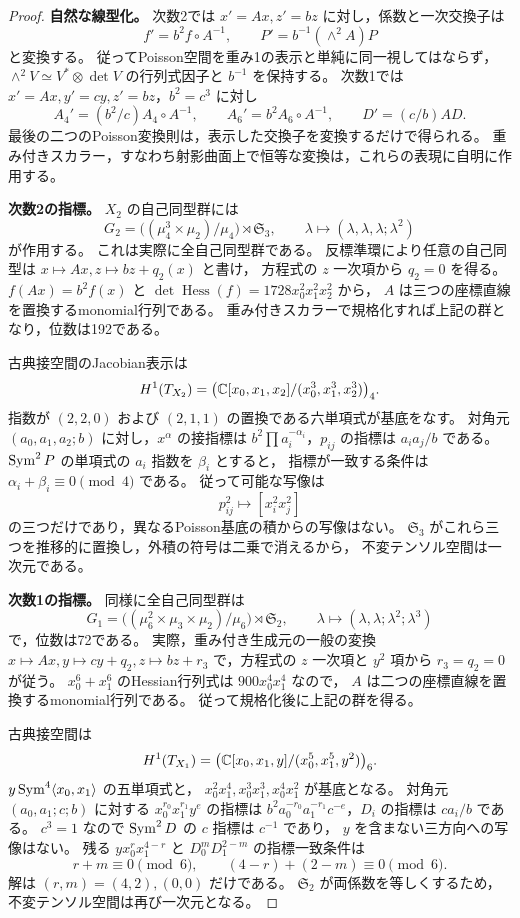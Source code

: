 \begin{proof}
\textbf{自然な線型化。}
次数2では $x'=Ax,z'=bz$ に対し，係数と一次交換子は
\[
 f'=b^2f\circ A^{-1},\qquad
 P'=b^{-1}(\wedge^2A)P
\]
と変換する。
従ってPoisson空間を重み1の表示と単純に同一視してはならず，
$\wedge^2V\simeq V^*\otimes\det V$ の行列式因子と $b^{-1}$ を保持する。
次数1では $x'=Ax,y'=cy,z'=bz$，$b^2=c^3$ に対し
\[
 A_4'=(b^2/c)A_4\circ A^{-1},\qquad
 A_6'=b^2A_6\circ A^{-1},\qquad
 D'=(c/b)AD.
\]
最後の二つのPoisson変換則は，表示した交換子を変換するだけで得られる。
重み付きスカラー，すなわち射影曲面上で恒等な変換は，これらの表現に自明に作用する。

\textbf{次数2の指標。}
$X_2$ の自己同型群には
\[
 G_2=\bigl((\mu_4^3\times\mu_2)/\mu_4\bigr)\rtimes\mathfrak S_3,
 \qquad
 \lambda\longmapsto(\lambda,\lambda,\lambda;\lambda^2)
\]
が作用する。
これは実際に全自己同型群である。
反標準環により任意の自己同型は $x\mapsto Ax,z\mapsto bz+q_2(x)$ と書け，
方程式の $z$ 一次項から $q_2=0$ を得る。
$f(Ax)=b^2f(x)$ と
$\det\operatorname{Hess}(f)=1728x_0^2x_1^2x_2^2$ から，
$A$ は三つの座標直線を置換するmonomial行列である。
重み付きスカラーで規格化すれば上記の群となり，位数は192である。

古典接空間のJacobian表示は
\[
 H^1(T_{X_2})=
 \bigl(\mathbb C[x_0,x_1,x_2]/(x_0^3,x_1^3,x_2^3)\bigr)_4.
\]
指数が $(2,2,0)$ および $(2,1,1)$ の置換である六単項式が基底をなす。
対角元 $(a_0,a_1,a_2;b)$ に対し，$x^\alpha$ の接指標は
$b^2\prod a_i^{-\alpha_i}$，$p_{ij}$ の指標は $a_ia_j/b$ である。
$\operatorname{Sym}^2P$ の単項式の $a_i$ 指数を $\beta_i$ とすると，
指標が一致する条件は $\alpha_i+\beta_i\equiv0\pmod4$ である。
従って可能な写像は
\[
 p_{ij}^2\longmapsto[x_i^2x_j^2]
\]
の三つだけであり，異なるPoisson基底の積からの写像はない。
$\mathfrak S_3$ がこれら三つを推移的に置換し，外積の符号は二乗で消えるから，
不変テンソル空間は一次元である。

\textbf{次数1の指標。}
同様に全自己同型群は
\[
 G_1=\bigl((\mu_6^2\times\mu_3\times\mu_2)/\mu_6\bigr)
       \rtimes\mathfrak S_2,
 \qquad
 \lambda\longmapsto(\lambda,\lambda;\lambda^2;\lambda^3)
\]
で，位数は72である。
実際，重み付き生成元の一般の変換
$x\mapsto Ax,y\mapsto cy+q_2,z\mapsto bz+r_3$
で，方程式の $z$ 一次項と $y^2$ 項から $r_3=q_2=0$ が従う。
$x_0^6+x_1^6$ のHessian行列式は $900x_0^4x_1^4$ なので，
$A$ は二つの座標直線を置換するmonomial行列である。
従って規格化後に上記の群を得る。

古典接空間は
\[
 H^1(T_{X_1})=
 \bigl(\mathbb C[x_0,x_1,y]/(x_0^5,x_1^5,y^2)\bigr)_6.
\]
$y\operatorname{Sym}^4\langle x_0,x_1\rangle$ の五単項式と，
$x_0^2x_1^4,x_0^3x_1^3,x_0^4x_1^2$ が基底となる。
対角元 $(a_0,a_1;c;b)$ に対する $x_0^{r_0}x_1^{r_1}y^e$ の指標は
$b^2a_0^{-r_0}a_1^{-r_1}c^{-e}$，$D_i$ の指標は $ca_i/b$ である。
$c^3=1$ なので $\operatorname{Sym}^2D$ の $c$ 指標は $c^{-1}$ であり，
$y$ を含まない三方向への写像はない。
残る $yx_0^r x_1^{4-r}$ と $D_0^mD_1^{2-m}$ の指標一致条件は
\[
 r+m\equiv0\pmod6,\qquad (4-r)+(2-m)\equiv0\pmod6.
\]
解は $(r,m)=(4,2),(0,0)$ だけである。
$\mathfrak S_2$ が両係数を等しくするため，不変テンソル空間は再び一次元となる。


\end{proof}
